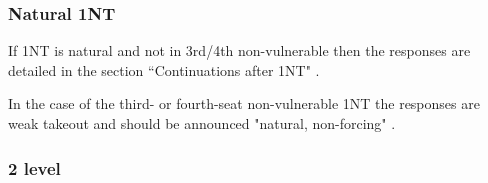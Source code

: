 \documentclass[a4paper,14pt]{extarticle}
\begin{document}
\begin{itemize}
{}
\subsubsection{Natural 1NT}
\label{sec:resp:1nnat}

If 1NT is natural and not in 3rd/4th non-vulnerable then the responses are
detailed in the section ``Continuations after 1NT" .

In the case of the third- or fourth-seat non-vulnerable 1NT the responses are
weak takeout and should be announced "natural, non-forcing" .


\newpage

\subsubsection{2 level}
\label{sec:resp:2level}
\label{note:18}


\end{itemize}
\end{document}
